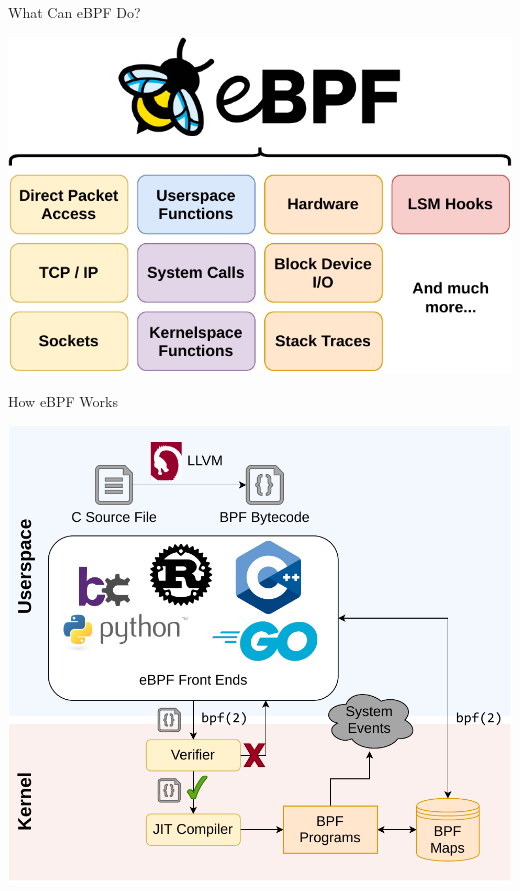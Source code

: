 \documentclass[12pt, dvipsnames, aspectratio=169]{beamer}
\begin{document}
\begin{frame}[c]{What Can eBPF Do?}
\begin{center}
    \color{black}
    \includegraphics[height=0.8\textheight]{figs/ebpf-overview.pdf}
\end{center}
\end{frame}

\begin{frame}[c]{How eBPF Works}
\begin{center}
    \color{black}
    \includegraphics[height=0.8\textheight]{figs/how-ebpf-works.pdf}
\end{center}
\end{frame}
\end{document}
